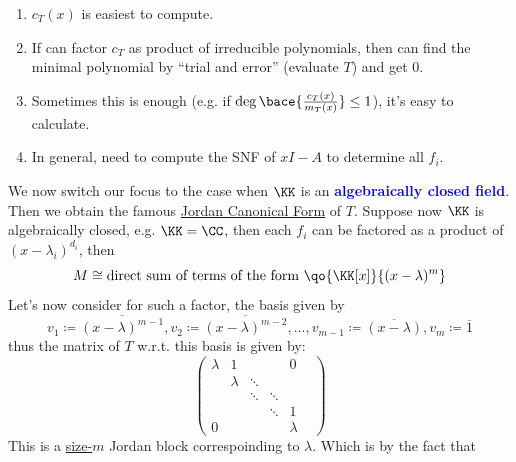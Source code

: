 \begin{note}
	\leavevmode
	\begin{enumerate}
		\item \( c_T(x) \) is easiest to compute.
		\item If can factor \( c_T \) as product of irreducible polynomials, then can find the minimal
		      polynomial by ``trial and error'' (evaluate \( T \)) and get \( 0 \).
		\item Sometimes this is enough (e.g. if \( \deg\bace{\frac{c_T(x)}{m_T(x)}} \leq 1 \)), it's
		      easy to calculate.
		\item In general, need to compute the SNF of \( xI -A \) to determine all \( f_i \).
	\end{enumerate}
\end{note}
We now switch our focus to the case when \( \KK \) is an \textbf{\textcolor{blue}{algebraically
		closed field}}. Then we obtain the famous \underline{Jordan Canonical Form} of \( T \). Suppose
now \( \KK \) is algebraically closed, e.g. \( \KK = \CC \), then each \( f_i \) can be factored
as a product of \( (x-\lambda_i)^{d_i} \), then
\[
	M \cong \text{direct sum of terms of the form } \qo{\KK[x]}{(x-\lambda)^m}
\]
Let's now consider for such a factor, the basis given by
\[
	v_1 \coloneqq \overline{(x-\lambda)^{m-1}}, v_2 \coloneqq  \overline{(x-\lambda)^{m-2}}, \ldots, v_{m-1}\coloneqq  \overline{(x-\lambda)},
	v_m \coloneqq  \overline{1}
\]
thus the matrix of \( T \) w.r.t. this basis is given by:
\[
	\begin{pmatrix}
		\lambda & 1       &        &        & 0         \\
		        & \lambda & \ddots &        &           \\
		        &         & \ddots & \ddots &         & \\
		        &         &        & \ddots & 1         \\
		0       &         &        &        & \lambda
	\end{pmatrix}
\]
This is a \underline{size-\( m \)} Jordan block correspoinding to \( \lambda \). Which is by the
fact that
